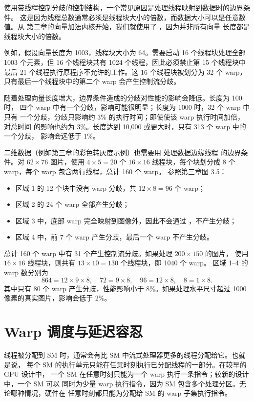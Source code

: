 使用带线程控制分歧的控制结构，一个常见原因是处理线程映射到数据时的边界条件。
这是因为线程总数通常必须是线程块大小的倍数，而数据大小可以是任意数值。从
第二章的向量加法内核开始，我们就使用了 ，因为并非所有向量
长度都是线程块大小的倍数。

例如，假设向量长度为 1003，线程块大小为 64。需要启动 16 个线程块处理全部
1003 个元素，但 16 个线程块共有 1024 个线程，因此必须禁止第 15 个线程块中
最后 21 个线程执行原程序不允许的工作。这 16 个线程块被划分为 32 个 warp，
只有最后一个线程块中的第二个 warp 会产生控制流分歧。

随着处理向量长度增大，边界条件造成的分歧对性能的影响会降低。长度为 100 时，
四个 warp 中有一个分歧，影响可能很明显；长度为 1000 时，32 个 warp 中只有
一个分歧，分歧只影响约 3\% 的执行时间；即使使该 warp 执行时间加倍，对总时间
的影响也约为 3\%。长度达到 10,000 或更大时，只有 313 个 warp 中的一个分歧，
影响会远低于 1\%。

二维数据（例如第三章的彩色转灰度示例）也需要用  处理数据边缘线程
的边界条件。对 $62\times76$ 图片，使用 $4\times5=20$ 个 $16\times16$
线程块，每个块划分成 8 个 warp，每个 warp 包含两行线程，总计 160 个 warp。
参照第三章图 3.5：

\begin{itemize}
  \item 区域 1 的 12 个块中没有 warp 分歧，共 $12\times8=96$ 个 warp；
  \item 区域 2 的 24 个 warp 全部产生分歧；
  \item 区域 3 中，底部 warp 完全映射到图像外，因此不会通过 ，不产生分歧；
  \item 区域 4 中，前 7 个 warp 产生分歧，最后一个 warp 不产生分歧。
\end{itemize}

总计 160 个 warp 中有 31 个产生控制流分歧。如果处理 $200\times150$ 的图片，
使用 $16\times16$ 线程块，则共有 $13\times10=130$ 个线程块，即 1040 个 warp。
区域 1–4 的 warp 数分别为
\[
  864=12\times9\times8,\quad
  72=9\times8,\quad
  96=12\times8,\quad
  8=1\times8.
\]
其中只有 80 个 warp 产生分歧，性能影响小于 8\%。如果处理水平尺寸超过 1000
像素的真实图片，影响会低于 2\%。

\section{Warp 调度与延迟容忍}
\label{sec:warp-scheduling-latency-tolerance}

线程被分配到 SM 时，通常会有比 SM 中流式处理器更多的线程分配给它。也就是说，
每个 SM 的执行单元只能在任意时刻执行已分配线程的一部分。在较早的 GPU 设计中，
一个 SM 在任意时刻只能为一个 warp 执行一条指令；较新的设计中，一个 SM 可以
同时为少量 warp 执行指令，因为 SM 包含多个处理分区。无论哪种情况，硬件在
任意时刻都只能为分配给 SM 的 warp 子集执行指令。


